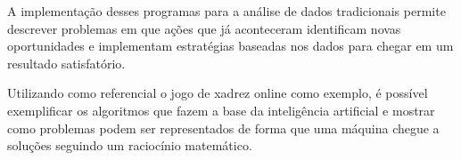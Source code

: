 A implementação desses programas para a análise de dados tradicionais permite descrever problemas em que ações que já
aconteceram identificam novas oportunidades e implementam estratégias baseadas nos dados para chegar em um resultado
satisfatório.

Utilizando como referencial o jogo de xadrez online como exemplo,  é possível exemplificar os algoritmos que fazem a base da inteligência
artificial e mostrar como problemas podem ser representados de forma que uma máquina chegue a soluções seguindo um raciocínio
matemático.
